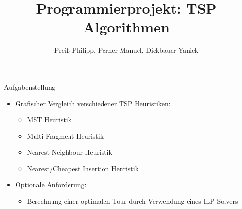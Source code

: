 
\title[EPL Projekt]{Programmierprojekt: TSP Algorithmen}
\author{Preiß Philipp, Perner Manuel, Dickbauer Yanick}



\begin{frame}
  \titlepage
\end{frame}

\begin{frame}{Aufgabenstellung}
	\begin{itemize}
		\item Grafischer Vergleich verschiedener TSP Heuristiken:
        \begin{itemize}
        	\item MST Heuristik
            \item Multi Fragment Heuristik
            \item Nearest Neighbour Heuristik
            \item Nearest/Cheapest Insertion Heuristik
        \end{itemize}
      \vspace{1cm}
      \item Optionale Anforderung:
      \begin{itemize}
      	\item Berechnung einer optimalen Tour durch Verwendung eines ILP Solvers
      \end{itemize}
	\end{itemize}
\end{frame}







